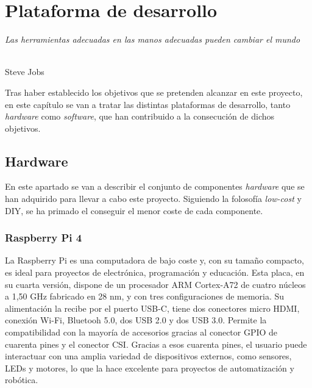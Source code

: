 \chapter{Plataforma de desarrollo}
\label{cap:capitulo4}

\begin{flushright}
\begin{minipage}[]{10cm}
\emph{Las herramientas adecuadas en las manos adecuadas pueden cambiar el mundo}\\
\end{minipage}\\

Steve Jobs\\
\end{flushright}

\vspace{1cm}

Tras haber establecido los objetivos que se pretenden alcanzar en este proyecto, en este capítulo se van a tratar las distintas plataformas de desarrollo, tanto \textit{hardware} como \textit{software}, que han contribuido a la consecución de dichos objetivos.

\section{Hardware}
\label{sec:hardware}

En este apartado se van a describir el conjunto de componentes \textit{hardware} que se han adquirido para llevar a cabo este proyecto. Siguiendo la folosofía \textit{low-cost} y \ac{DIY}, se ha primado el conseguir el menor coste de cada componente.

\subsection{Raspberry Pi 4}
\label{subsec:raspberry}

La Raspberry Pi es una computadora de bajo coste y, con su tamaño compacto, es ideal para proyectos de electrónica, programación y educación. Esta placa, en su cuarta versión, dispone de un procesador ARM Cortex-A72 de cuatro núcleos a 1,50 GHz fabricado en 28 nm, y con tres configuraciones de memoria. Su alimentación la recibe por el puerto USB-C, tiene dos conectores micro HDMI, conexión Wi-Fi, Bluetooh 5.0, dos USB 2.0 y dos USB 3.0. Permite la compatibilidad con la mayoría de accesorios gracias al conector GPIO de cuarenta pines y el conector \ac{CSI}. Gracias a esos cuarenta pines, el usuario puede interactuar con una amplia variedad de dispositivos externos, como sensores, LEDs y motores, lo que la hace excelente para proyectos de automatización y robótica. 

